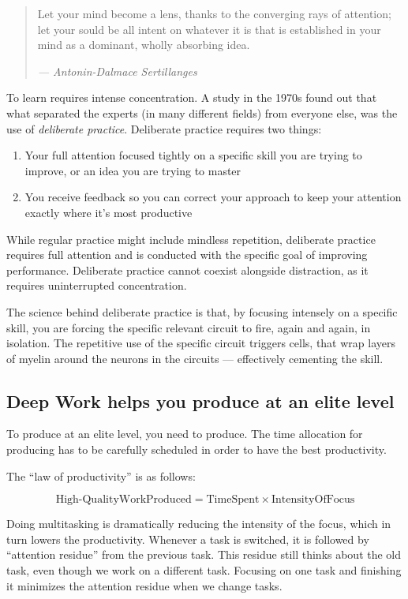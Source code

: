 \documentclass[12pt, letterpaper]{article}
\begin{document}
\begin{quote}
Let your mind become a lens, thanks to the converging rays of attention; let your sould be all intent on whatever it is that is established in your mind as a dominant, wholly absorbing idea. \par\emph{--- Antonin-Dalmace Sertillanges}
\end{quote}

To learn requires intense concentration. A study in the 1970s found out that what separated the experts (in many different fields) from everyone else, was the use of \emph{deliberate practice}. Deliberate practice requires two things:
\begin{enumerate}
    \item Your full attention focused tightly on a specific skill you are trying to improve, or an idea you are trying to master
    \item You receive feedback so you can correct your approach to keep your attention exactly where it's most productive
\end{enumerate}

While regular practice might include mindless repetition, deliberate practice requires full attention and is conducted with the specific goal of improving performance.
Deliberate practice cannot coexist alongside distraction, as it requires uninterrupted concentration.

The science behind deliberate practice is that, by focusing intensely on a specific skill, you are forcing the specific relevant circuit to fire, again and again, in isolation. The repetitive use of the specific circuit triggers cells, that wrap layers of myelin around the neurons in the circuits --- effectively cementing the skill.

\subsection*{Deep Work helps you produce at an elite level}
To produce at an elite level, you need to produce. The time allocation for producing has to be carefully scheduled in order to have the best productivity.

The ``law of productivity'' is as follows:

\begin{equation*}
    \text{High-QualityWorkProduced} = \text{TimeSpent} \times \text{IntensityOfFocus}
\end{equation*}

Doing multitasking is dramatically reducing the intensity of the focus, which in turn lowers the productivity. Whenever a task is switched, it is followed by ``attention residue'' from the previous task. This residue still thinks about the old task, even though we work on a different task. Focusing on one task and finishing it minimizes the attention residue when we change tasks.
\end{document}
